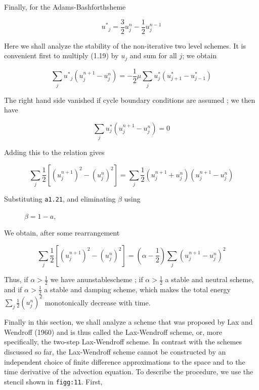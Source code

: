 Finally, for the Adams-Bashforthsheme

 \[{u^{*}}_{j} = \frac{3}{2}u_{j}^{n} - \frac{1}{2}u_{j}^{n - 1}\]

Here we shall analyze the stability of the non-iterative two level
schemes. It is convenient first to multiply (1.19) by \(u_{j}\) and sum
for all \(j\); we obtain

\[\sum_{j}{u^{*}}_{j}\left( u_{j}^{n + 1} - u_{j}^{n} \right) = - \frac{1}{2}\mu\sum_{j}u^{*}_{j}\left( u^{*}_{j+1} - u^{*}_{j - 1} \right)\]

The right hand side vanished if cycle boundary conditions are assumed ;
we then have

\[\sum_{j}u^{*}_{j}\left( u_{j}^{n + 1} - u_{j}^{n} \right) = 0\]

Adding this to the relation gives

\[\sum_{j}\frac{1}{2}\left\lbrack \left( u_{j}^{n + 1} \right)^{2} - \left( u_{j}^{n} \right)^{2} \right\rbrack = \sum_{j}\frac{1}{2}\left( u_{j}^{n + 1} + u_{j}^{n} \right)\left( u_{j}^{n + 1} - u_{j}^{n} \right)\]

\begin{description}
 \item[Substituting \texttt{a1.21}, and eliminating \(\beta\) using]
 \(\beta = 1 - a\),
\end{description}

We obtain, after some rearrangement

 \[\sum_{j}\frac{1}{2}\left\lbrack
\left( u_{j}^{n + 1} \right)^{2} - \left( u_{j}^{n} \right)^{2} \right\rbrack
= \left( \alpha - \frac{1}{2} \right)\sum_{j}\left( u_{j}^{n + 1} - u_{j}^{n} \right)^{2}\]

Thus, if \(\alpha > \frac{1}{2}\) we have anunstablescheme ; if
\(\alpha > \frac{1}{2}\) a stable and neutral scheme, and if
\(\alpha > \frac{1}{2}\) a stable and damping scheme, which makes the
total energy \(\sum_{j}\frac{1}{2}\left( u_{j}^{n} \right)^{2}\)
monotonically decrease with time.

Finally in this section, we shall analyze a scheme that was proposed by
Lax and Wendroff (1960) and is thus called the Lax-Wendroff scheme, or,
more specifically, the two-step Lax-Wendroff scheme. In contrast with
the schemes discussed so far, the Lax-Wendroff scheme cannot be
constructed by an independent choice of finite difference approximations
to the space and to the time derivative of the advection equation. To
describe the procedure, we use the stencil shown in \texttt{figg:11}.
First,

